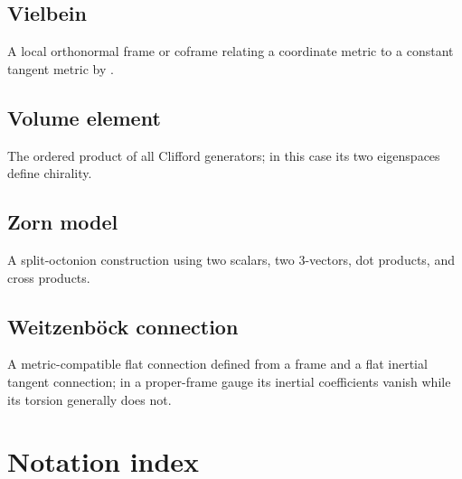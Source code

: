 \documentclass[11pt]{article}
\begin{document}
\subsection{Vielbein}

A local orthonormal frame or coframe relating a coordinate metric to a constant tangent metric by \texttt{}.

\subsection{Volume element}

The ordered product of all Clifford generators; in this case its two eigenspaces define chirality.

\subsection{Zorn model}

A split-octonion construction using two scalars, two 3-vectors, dot products, and cross products.

\subsection{Weitzenböck connection}

A metric-compatible flat connection defined from a frame and a flat inertial tangent connection; in a proper-frame gauge its inertial coefficients vanish while its torsion generally does not.

\section{Notation index}
\end{document}
